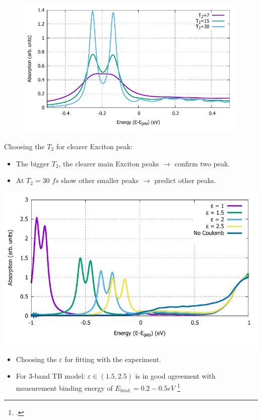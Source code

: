 \documentclass{beamer}
\begin{document}
\begin{frame}
	\begin{figure}
		\includegraphics[width=0.8\linewidth]{images/varyT2.pdf}
	\end{figure}
Choosing the $T_2$ for clearer Exciton peak:
	\begin{itemize}
		\item The bigger $T_2$, the clearer main Exciton peaks $\to $ confirm two peak.
		\item At $T_2 = 30$ \(fs\) show other smaller peaks $\to $ predict other peaks.
	\end{itemize}
\end{frame}
\begin{frame}
	\begin{center}		
		\includegraphics[width=0.8\linewidth]{images/varyepsilon.pdf}
	\end{center}
	\begin{itemize}
		\item Choosing the $\varepsilon$ for fitting with the experiment.
		\item For 3-band TB model: $\varepsilon \in (1.5,2.5)$ is in good agreement with measurement binding energy of $E_{bind.}= 0.2-0.5 eV$ \footcite{zhang_absorption_2014}
	\end{itemize}
\end{frame}
\end{document}
